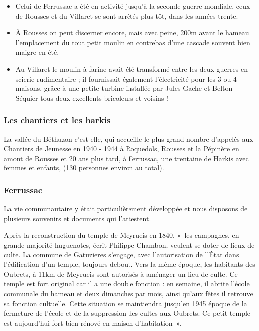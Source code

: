 \begin{itemize}
\item Celui de Ferrussac a été en activité jusqu’à la seconde guerre mondiale, ceux de Rousses et du Villaret se sont arrêtés plus tôt, dans les années trente.
\item À Rousses on peut discerner encore, mais avec peine, 200m avant le hameau l’emplacement du tout
petit moulin en contrebas d’une cascade souvent bien maigre en été.
\item Au Villaret le moulin à farine avait été transformé entre les deux guerres en scierie rudimentaire ; il
fournissait également l’électricité pour les 3 ou 4 maisons, grâce à une petite turbine installée par Jules
Gache et Belton Séquier tous deux excellents bricoleurs et voisins !
\end{itemize}

\subsubsection{Les chantiers et les harkis}

La vallée du Béthuzon c’est elle, qui accueille le plus grand nombre
d’appelés aux Chantiers de Jeunesse en 1940 - 1944 à Roquedols, Rousses et la Pépinère en amont de
Rousses et 20 ans plus tard, à Ferrussac, une trentaine de Harkis avec femmes et enfants, (130
personnes environ au total).

\subsubsection{Ferrussac}


La vie communautaire y était particulièrement développée et nous disposons de plusieurs souvenirs et
documents qui l’attestent.


Après la reconstruction du temple de Meyrueis en 1840, «~les campagnes, en
grande majorité huguenotes, écrit Philippe Chambon, veulent se doter de lieux de culte. La commune
de Gatuzieres s’engage, avec l’autorisation de l’État dans l’édification d’un temple, toujours debout.
Vers la même époque, les habitants des Oubrets, à 11km de Meyrueis sont autorisés à aménager un
lieu de culte. Ce temple est fort original car il a une double fonction : en semaine, il abrite l’école
communale du hameau et deux dimanches par mois, ainsi qu’aux fêtes il retrouve sa fonction cultuelle.
Cette situation se maintiendra jusqu’en 1945 époque de la fermeture de l’école et de la suppression
des cultes aux Oubrets. Ce petit temple est aujourd’hui fort bien rénové en maison d’habitation~».

